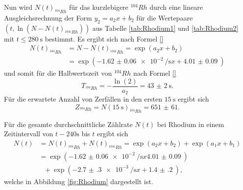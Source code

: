 Nun wird $N(t)_{^{104}Rh}$ für das kurzlebigere $^{104} Rh$ durch eine lineare Ausgleichsrechnung der Form $y_2=a_2 x+b_2$ für die Wertepaare $(t,\ln(N-N(t)_{^{104i}Rh}))$ aus Tabelle \ref{tab:Rhodium1} und \ref{tab:Rhodium2}  mit $t\le \SI{280}{\second}$ bestimmt.
Es ergibt sich nach Formel \eqref{}
\begin{align}
N(t)_{^{104}Rh} &= N-N(t)_{^{104i}Rh} = \exp\left(a_2 x + b_2\right) \\
 &= \exp\left(-\SI{1.62(6)e-2}{\per\second} x + \SI{4.01(9)}{}\right)
\end{align}
und somit für die Halbwertszeit von $^{104} Rh$ nach Formel \eqref{}
\begin{equation}
T_{^{104}Rh} = -\frac{\ln(2)}{a_2}=\SI{43(2)}{\second}\text{.}
\end{equation}
Für die erwartete Anzahl von Zerfällen in den ersten $\SI{15}{\second}$ ergibt sich
\begin{equation}
Z_{^{104}Rh} = N(\SI{15}{\second})_{^{104}Rh}=\num{651(61)}\text{.}
\end{equation}

Für die gesamte durchschnittliche Zählrate $N(t)$ bei Rhodium in einem Zeitintervall von $t-240\si{\second}$ bis $t$ ergibt sich
\begin{align}
N(t)&=N(t)_{^{104}Rh}+N(t)_{^{104i}Rh} =  \exp\left(a_2 x + b_2\right)+\exp\left(a_1 x + b_1\right) \\
&= \exp\left(-\SI{1.62(6)e-2}{\per\second} x \SI{4.01(9)}{}\right) \\
&\text{ }+\exp\left(-\SI{2.7(3)e-3}{\per\second} x + \SI{1.4(2)}{}\right)\text{,}
\end{align}
welche in Abbildung \ref{fig:Rhodium} dargestellt ist.

